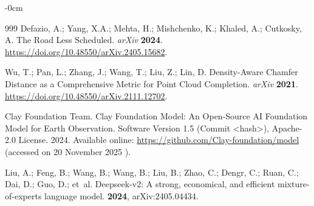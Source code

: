 \documentclass[remotesensing,article,accept,pdftex,moreauthors]{Definitions/mdpi}
\begin{document}
\begin{adjustwidth}{-\extralength}{0cm}
\begin{thebibliography}{999}
Defazio, A.; Yang, X.A.; Mehta, H.; Mishchenko, K.; Khaled, A.; Cutkosky, A.
\newblock The Road Less Scheduled. \emph{arXiv
} \textbf{2024}.
  {\url{https://doi.org/10.48550/arXiv.2405.15682}}.

Wu, T.; Pan, L.; Zhang, J.; Wang, T.; Liu, Z.; Lin, D.
\newblock Density-Aware Chamfer Distance as a Comprehensive Metric for Point
  Cloud Completion. \emph{arXiv
}  \textbf{2021}.
  {\url{https://doi.org/10.48550/arXiv.2111.12702}}.

{Clay Foundation Team}.
\newblock Clay Foundation Model: An Open-Source AI Foundation Model for Earth
  Observation. Software Version 1.5 (Commit <hash>), Apache-2.0 License. 2024. Available online:
\newblock \url{https://github.com/Clay-foundation/model} (accessed on 20 November 2025
).

Liu, A.; Feng, B.; Wang, B.; Wang, B.; Liu, B.; Zhao, C.; Dengr, C.; Ruan, C.;
  Dai, D.; Guo, D.;  et~al.
\newblock Deepseek-v2: A strong, economical, and efficient mixture-of-experts
  language model.
 {\bf 2024}, arXiv:2405.04434.

\end{thebibliography}

  \PublishersNote{}
  \end{adjustwidth}

\end{document}
